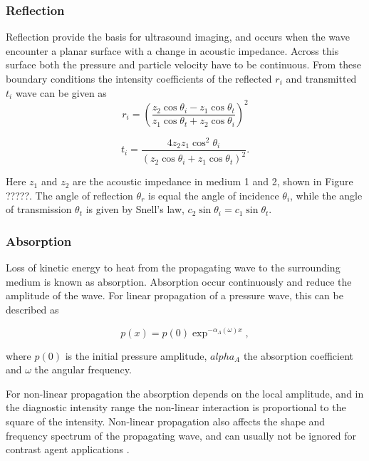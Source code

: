  
\subsubsection{Reflection}
Reflection provide the basis for ultrasound imaging, and occurs when the wave encounter a planar surface with a change in acoustic impedance. Across this surface both the pressure and particle velocity have to be continuous. From these boundary conditions 
the intensity coefficients of the reflected $r_i$ and transmitted $t_i$ wave can be given as \cite{wells1969physical}
\begin{equation}
\label{fresnel}
r_i = \left(\frac{z_2 \cos \theta_i - z_1 \cos \theta_t}{z_1 \cos \theta_t + z_2 \cos \theta_i}\right)^2
\end{equation}

\begin{equation}
\label{fresnel2}
t_i = \frac{4z_2 z_1 \cos^2 \theta_i}{(z_2 \cos \theta_i + z_1 \cos \theta_t)^2}.
\end{equation}

Here $z_1$ and $z_2$ are the acoustic impedance in medium 1 and 2, shown in Figure ?????. The angle of reflection $\theta_r$ is equal the angle of incidence $\theta_i$, while the angle of transmission $\theta_t$ is given by Snell's law\cite{blackstock2000fundamentals}, $ c_2 \sin \theta_i = c_1 \sin \theta_t$. 

\subsubsection{Absorption}
Loss of kinetic energy to heat from the propagating wave to the surrounding medium is known as absorption. Absorption occur continuously and reduce the amplitude of the wave. For linear propagation of a pressure wave, this can be described as 

\begin{equation}
p(x) = p(0)\exp^{-\alpha_A(\omega)x},
\end{equation} 

where $p(0)$ is the initial pressure amplitude, $alpha_A$ the absorption coefficient and $\omega$ the angular frequency.

For non-linear propagation the absorption depends on the local amplitude, and in the diagnostic intensity range the non-linear interaction is proportional to the square of the intensity\cite{:/content/asa/journal/jasa/97/3/10.1121/1.412091}. Non-linear propagation also affects the shape and frequency spectrum of the propagating wave, and can usually not be ignored for contrast agent applications \cite{Healey2012}. 


